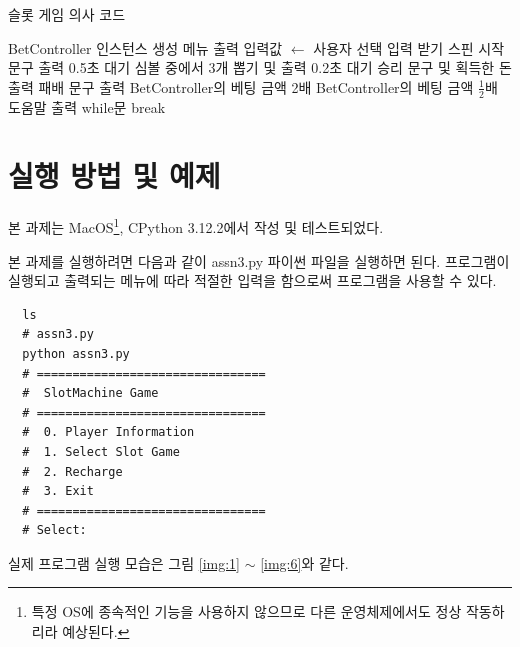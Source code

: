 \documentclass{article}
\begin{document}
\begin{algorithm}
  \caption{슬롯 게임 의사 코드} \label{alg:slotgame}
  \begin{algorithmic}
    \State BetController 인스턴스 생성
    \While {}
      \State 메뉴 출력
      \State 입력값 $\gets$ 사용자 선택 입력 받기
        \State 스핀 시작 문구 출력
        \State 0.5초 대기
        \State 심볼 중에서 3개 뽑기 및 출력
        \State 0.2초 대기
          \State 승리 문구 및 획득한 돈 출력
        \Else
          \State 패배 문구 출력
        \EndIf
        \State BetController의 베팅 금액 2배
        \State BetController의 베팅 금액 $\frac{1}{2}$배
        \State 도움말 출력
        \State while문 break
      \EndIf
    \EndWhile
  \end{algorithmic}
\end{algorithm}

\section{실행 방법 및 예제}

본 과제는 MacOS\footnote{특정 OS에 종속적인 기능을 사용하지 않으므로 다른 운영체제에서도 정상 작동하리라 예상된다.}, CPython 3.12.2에서 작성 및 테스트되었다.

본 과제를 실행하려면 다음과 같이 assn3.py 파이썬 파일을 실행하면 된다.
프로그램이 실행되고 출력되는 메뉴에 따라 적절한 입력을 함으로써 프로그램을 사용할 수 있다.
\begin{verbatim}
  ls
  # assn3.py
  python assn3.py
  # ================================
  #  SlotMachine Game
  # ================================
  #  0. Player Information
  #  1. Select Slot Game
  #  2. Recharge
  #  3. Exit
  # ================================
  # Select:
\end{verbatim}

실제 프로그램 실행 모습은 그림 \ref{img:1} $\sim$ \ref{img:6}와 같다.
\end{document}
